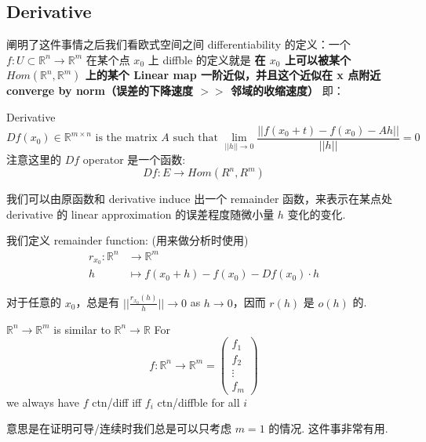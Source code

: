 \subsection{Derivative}
\noindent 阐明了这件事情之后我们看欧式空间之间 differentiability 的定义：一个 $f: U \subset \mathbb{R}^n \rightarrow \mathbb{R}^m$ 在某个点 $x_0$ 上 diffble 的定义就是 \textbf{在 $x_0$ 上可以被某个 $Hom(\mathbb{R}^n, \mathbb{R}^m)$ 上的某个 Linear map 一阶近似，并且这个近似在 x 点附近 converge by norm（误差的下降速度 $>>$ 邻域的收缩速度）}
即：
\begin{definition}{Derivative} \label{derivartive}
    $$
    Df(x_0) \in \mathbb{R}^{m \times n} \text{ is the matrix } A \text{ such that } \lim_{||h|| \rightarrow 0} \frac{||f(x_0 + t) - f(x_0) - Ah||}{||h||} = 0
    $$
    注意这里的 $Df$ operator 是一个函数:
    $$
    Df : E \rightarrow Hom(R^n, R^m)
    $$
\end{definition}

我们可以由原函数和 derivative induce 出一个 remainder 函数，来表示在某点处 derivative 的 linear approximation 的误差程度随微小量 $h$ 变化的变化. 

\begin{definition}
我们定义 remainder function: (用来做分析时使用)
\begin{align}
    r_{x_0} : \mathbb{R}^n &  \rightarrow \mathbb{R}^m \\
    h & \mapsto f(x_0 + h) - f(x_0) - Df(x_0) \cdot h
\end{align}
\end{definition}

\noindent 对于任意的 $x_0$，总是有 $||\frac{r_{x_0}(h)}{h}|| \rightarrow 0$ as $h \rightarrow 0$，因而 $r(h)$ 是 $o(h)$ 的.

\begin{theorem}{$\mathbb{R}^n \rightarrow \mathbb{R}^m$ is similar to $\mathbb{R}^n \rightarrow \mathbb{R}$} \label{$f$ ctn/diff iff $f_i$ ctn/diffble for all $i$}
    For $$f: \mathbb{R}^n \rightarrow \mathbb{R}^m = \begin{pmatrix}
        f_1 \\ f_2 \\ \vdots \\ f_m
    \end{pmatrix}
    $$ we always have
    $f$ ctn/diff iff $f_i$ ctn/diffble for all $i$
\end{theorem}
意思是在证明可导/连续时我们总是可以只考虑 $m=1$ 的情况. 这件事非常有用.

